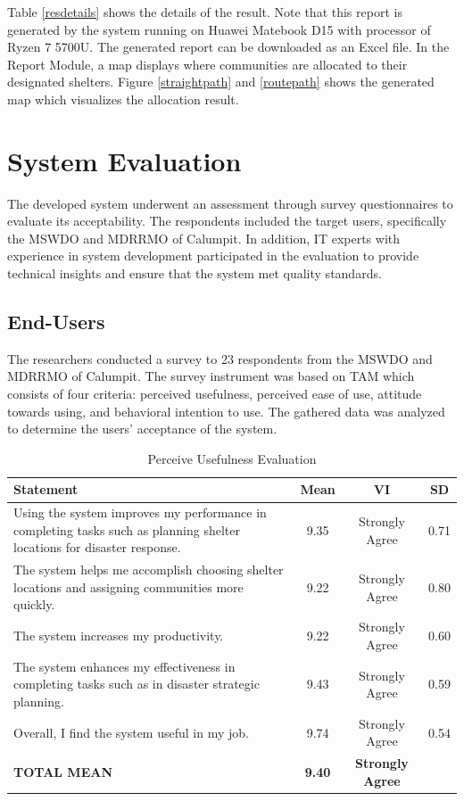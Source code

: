 	 Table \ref{resdetails} shows the details of the result. Note that this report is generated by the system running on Huawei Matebook D15 with processor of Ryzen 7 5700U. The generated report can be downloaded as an Excel file. In the Report Module, a map displays where communities are allocated to their designated shelters. Figure \ref{straightpath} and \ref{routepath} shows the generated map which visualizes the allocation result.
	
	

\section{System Evaluation}
	The developed system underwent an assessment through survey questionnaires to evaluate its acceptability. The respondents included the target users, specifically the MSWDO and MDRRMO of Calumpit. In addition, IT experts with experience in system development participated in the evaluation to provide technical insights and ensure that the system met quality standards.

\subsection{End-Users}
	The researchers conducted a survey to 23 respondents from the MSWDO and MDRRMO of Calumpit. The survey instrument was based on TAM which consists of four criteria: perceived usefulness, perceived ease of use, attitude towards using, and behavioral intention to use. The gathered data was analyzed to determine the users’ acceptance of the system. 

\begin{table}[ht]
	\centering
	\caption{Perceive Usefulness Evaluation}
	\label{percuse}
	\renewcommand{\arraystretch}{1.2}
	\begin{tabularx}{\linewidth}{|X|c|c|c|}
		\hline
		\textbf{Statement} & \textbf{Mean} & \textbf{VI} & \textbf{SD} \\ \hline
		Using the system improves my performance in completing tasks such as planning shelter locations for disaster response.
		& 9.35 & Strongly Agree & 0.71 \\ \hline
		The system helps me accomplish choosing shelter locations and assigning communities more quickly.
		& 9.22 & Strongly Agree & 0.80 \\ \hline
		The system increases my productivity.
		& 9.22 & Strongly Agree & 0.60 \\ \hline
		The system enhances my effectiveness in completing tasks such as in disaster strategic planning.
		& 9.43 & Strongly Agree & 0.59 \\ \hline
		Overall, I find the system useful in my job.
		& 9.74 & Strongly Agree & 0.54 \\ \hline
		\textbf{TOTAL MEAN} & \textbf{9.40} & \textbf{Strongly Agree} & \\ \hline
	\end{tabularx}
\end{table}


